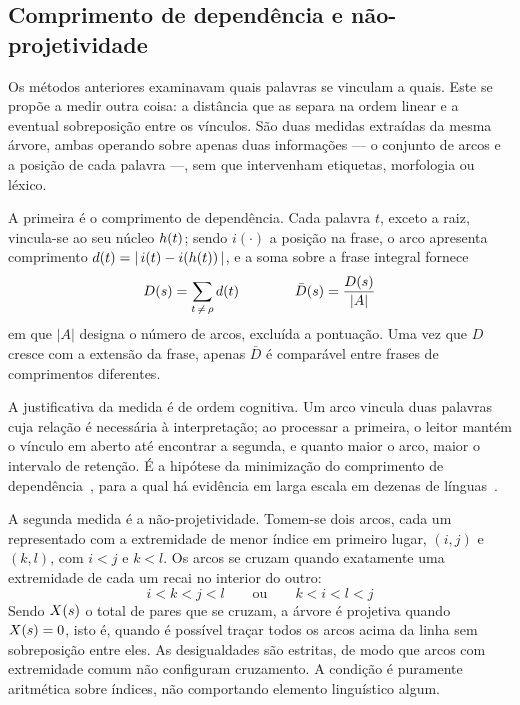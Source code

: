 \subsection{Comprimento de dependência e não-projetividade}
\label{met:dependencia}

\indent\indent Os métodos anteriores examinavam quais palavras se vinculam a quais. Este se propõe a medir
outra coisa: a distância que as separa na ordem linear e a eventual sobreposição entre os
vínculos. São duas medidas extraídas da mesma árvore, ambas operando sobre apenas duas
informações --- o conjunto de arcos e a posição de cada palavra ---, sem que intervenham
etiquetas, morfologia ou léxico.

A primeira é o comprimento de dependência. Cada palavra $t$, exceto a raiz, vincula-se ao seu
núcleo $h(t)$; sendo $i(\cdot)$ a posição na frase, o arco apresenta comprimento
$d(t) = \lvert\, i(t) - i(h(t)) \,\rvert$, e a soma sobre a frase integral fornece
%
\begin{equation}
D(s) = \sum_{t \,\neq\, \rho} d(t)
\qquad\qquad
\bar{D}(s) = \frac{D(s)}{|A|}
\label{eq:dep-D}
\end{equation}
%
em que $|A|$ designa o número de arcos, excluída a pontuação. Uma vez que $D$ cresce com a
extensão da frase, apenas $\bar{D}$ é comparável entre frases de comprimentos diferentes.

A justificativa da medida é de ordem cognitiva. Um arco vincula duas palavras cuja relação é
necessária à interpretação; ao processar a primeira, o leitor mantém o vínculo em aberto até
encontrar a segunda, e quanto maior o arco, maior o intervalo de retenção. É a hipótese da
minimização do comprimento de dependência~\cite{gibson1998,liu2008}, para a qual há evidência
em larga escala em dezenas de línguas~\cite{futrell2015}.

A segunda medida é a não-projetividade. Tomem-se dois arcos, cada um representado com a
extremidade de menor índice em primeiro lugar, $(i,j)$ e $(k,l)$, com $i<j$ e $k<l$. Os arcos
se cruzam quando exatamente uma extremidade de cada um recai no interior do outro:
%
\begin{equation}
i < k < j < l \qquad\text{ou}\qquad k < i < l < j
\label{eq:dep-cruzam}
\end{equation}
%
Sendo $X(s)$ o total de pares que se cruzam, a árvore é projetiva quando $X(s) = 0$,
isto é, quando é possível traçar todos os arcos acima da linha sem sobreposição entre eles. As
desigualdades são estritas, de modo que arcos com extremidade comum não configuram cruzamento.
A condição é puramente aritmética sobre índices, não comportando elemento linguístico algum.
